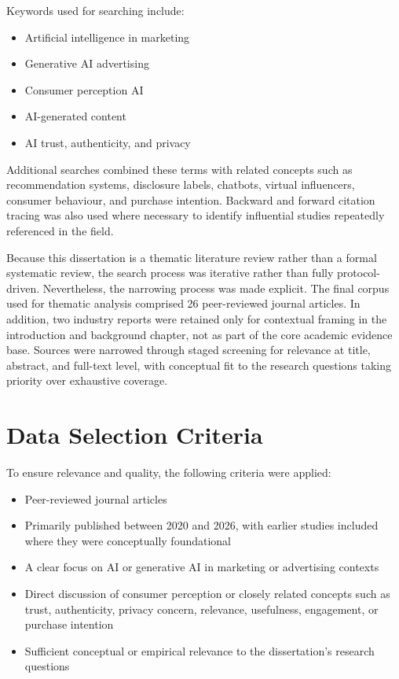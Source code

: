 Keywords used for searching include:

\begin{itemize}
    \item Artificial intelligence in marketing
    \item Generative AI advertising
    \item Consumer perception AI
    \item AI-generated content
    \item AI trust, authenticity, and privacy
\end{itemize}

Additional searches combined these terms with related concepts such as recommendation systems, disclosure labels, chatbots, virtual influencers, consumer behaviour, and purchase intention. Backward and forward citation tracing was also used where necessary to identify influential studies repeatedly referenced in the field.

Because this dissertation is a thematic literature review rather than a formal systematic review, the search process was iterative rather than fully protocol-driven. Nevertheless, the narrowing process was made explicit. The final corpus used for thematic analysis comprised 26 peer-reviewed journal articles. In addition, two industry reports were retained only for contextual framing in the introduction and background chapter, not as part of the core academic evidence base. Sources were narrowed through staged screening for relevance at title, abstract, and full-text level, with conceptual fit to the research questions taking priority over exhaustive coverage.

\section{Data Selection Criteria}
To ensure relevance and quality, the following criteria were applied:

\begin{itemize}
    \item Peer-reviewed journal articles
    \item Primarily published between 2020 and 2026, with earlier studies included where they were conceptually foundational
    \item A clear focus on AI or generative AI in marketing or advertising contexts
    \item Direct discussion of consumer perception or closely related concepts such as trust, authenticity, privacy concern, relevance, usefulness, engagement, or purchase intention
    \item Sufficient conceptual or empirical relevance to the dissertation's research questions
\end{itemize}

